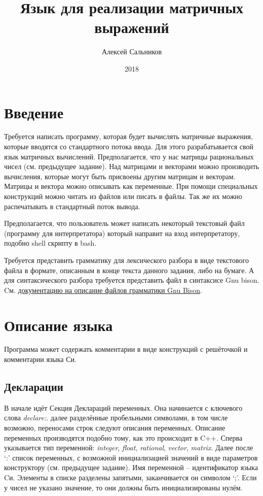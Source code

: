 \documentclass[a4paper,11pt]{article}
\title{Язык для реализации матричных выражений}
\author{Алексей Сальников}
\date{2018}
\begin{document}
\maketitle

\section{Введение}

Требуется написать программу, которая будет вычислять матричные выражения,
которые вводятся со стандартного потока ввода. Для этого разрабатывается 
свой язык матричных вычислений. Предполагается, что у нас матрицы 
рациональных чисел (см. предыдущее задание). Над матрицами и векторами 
можно производить вычисления, которые могут быть присвоены другим матрицам 
и векторам. Матрицы  и вектора можно описывать как переменные. При помощи 
специальных конструкций можно читать из файлов или писать в файлы. Так же
их можно распечатывать в стандартный поток вывода. 

Предполагается, что пользователь может написать некоторый текстовый файл
(программу для интерпретатора) который направит на вход интерпретатору, 
подобно shell скрипту в bash.

Требуется представить грамматику для лексического разбора в виде 
текстового файла в формате, описанным в конце текста данного задания, 
либо на бумаге. А для синтаксического разбора требуется представить файл 
в синтаксисе Gnu bison. Cм. 
\href{https://www.gnu.org/software/bison/manual/html_node/Grammar-File.html#Grammar-File}%
{документацию на описание файлов грамматики Gnu Bison}.

\section{Описание языка}

Программа может содержать комментарии в виде конструкций 
с решёточкой и комментарии языка Си.

\subsection{Декларации}

В начале идёт Секция Деклараций переменных. Она начинается с ключевого слова 
\textit{declare:}. далее разделённые пробельными символами, в том числе возможно,
переносами строк следуют описания переменных. Описание переменных производятся 
подобно тому, как это происходит в C++. Сперва указывается тип переменной: 
\textit{integer}, \textit{float}, \textit{rational}, \textit{vector}, \textit{matrix}. Далее после `:' 
список переменных, с возможной инициализацией значений в виде 
параметров конструктору (см. предыдущее задание). Имя переменной 
-- идентификатор языка Cи. Элементы в списке разделены запятыми, 
заканчивается он символом `;'. Если у чисел не указано значение, 
то они должны быть инициализированы нулём.
\end{document}
